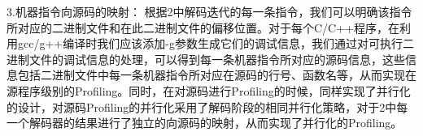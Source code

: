 3.机器指令向源码的映射：
根据2中解码迭代的每一条指令，我们可以明确该指令所对应的二进制文件和在此二进制文件的偏移位置。对于每个C/C++程序，在利用gcc/g++编译时我们应该添加-g参数生成它们的调试信息，我们通过对可执行二进制文件的调试信息的处理，可以得到每一条机器指令所对应的源码信息，这些信息包括二进制文件中每一条机器指令所对应在源码的行号、函数名等，从而实现在源程序级别的Profiling。同时，在对源码进行Profiling的时候，同样实现了并行化的设计，对源码Profiling的并行化采用了解码阶段的相同并行化策略，对于2中每一个解码器的结果进行了独立的向源码的映射，从而实现了并行化的Profiling。